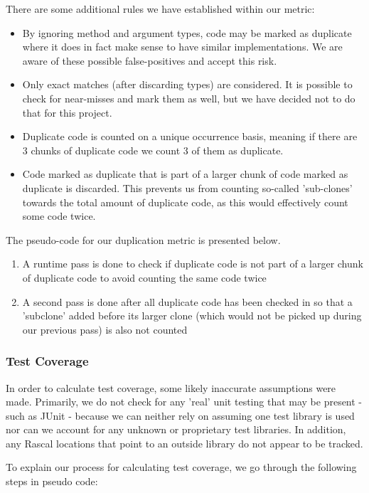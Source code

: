 \documentclass{article}
\begin{document}
There are some additional rules we have established within our metric:
\begin{itemize}
\item By ignoring method and argument types, code may be marked as duplicate where it does in fact make sense to have similar implementations. We are aware of these possible false-positives and accept this risk.
\item Only exact matches (after discarding types) are considered. It is possible to check for near-misses and mark them as well, but we have decided not to do that for this project.
\item Duplicate code is counted on a unique occurrence basis, meaning if there are 3 chunks of duplicate code we count 3 of them as duplicate.
\item Code marked as duplicate that is part of a larger chunk of code marked as duplicate is discarded. This prevents us from counting so-called 'sub-clones' towards the total amount of duplicate code, as this would effectively count some code twice.
\end{itemize}

The pseudo-code for our duplication metric is presented below.

\begin{enumerate}
\item A runtime pass is done to check if duplicate code is not part of a larger chunk of duplicate code to avoid counting the same code twice
\item A second pass is done after all duplicate code has been checked in so that a 'subclone' added before its larger clone (which would not be picked up during our previous pass) is also not counted
\end{enumerate}

\subsubsection{Test Coverage} \label{assumetests}
In order to calculate test coverage, some likely inaccurate assumptions were made.
Primarily, we do not check for any 'real' unit testing that may be present - such as JUnit - because we can neither rely on assuming one test library is used nor can we account for any unknown or proprietary test libraries. In addition, any Rascal locations that point to an outside library do not appear to be tracked.

To explain our process for calculating test coverage, we go through the following steps in pseudo code:
\end{document}
